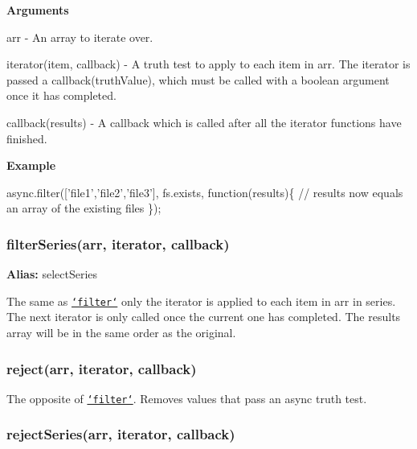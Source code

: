 {\bfseries Arguments}


\begin{DoxyItemize}
\item {\ttfamily arr} -\/ An array to iterate over.
\item {\ttfamily iterator(item, callback)} -\/ A truth test to apply to each item in {\ttfamily arr}. The {\ttfamily iterator} is passed a {\ttfamily callback(truth\+Value)}, which must be called with a boolean argument once it has completed.
\item {\ttfamily callback(results)} -\/ A callback which is called after all the {\ttfamily iterator} functions have finished.
\end{DoxyItemize}

{\bfseries Example}


\begin{DoxyCode}
async.filter([\textcolor{stringliteral}{'file1'},\textcolor{stringliteral}{'file2'},\textcolor{stringliteral}{'file3'}], fs.exists, \textcolor{keyword}{function}(results)\{
    \textcolor{comment}{// results now equals an array of the existing files}
\});
\end{DoxyCode}
 



\label{_selectSeries}%
 \label{_filterSeries}%
 \subsubsection*{filter\+Series(arr, iterator, callback)}

{\bfseries Alias\+:} {\ttfamily select\+Series}

The same as \href{#filter}{\tt `filter`} only the {\ttfamily iterator} is applied to each item in {\ttfamily arr} in series. The next {\ttfamily iterator} is only called once the current one has completed. The results array will be in the same order as the original. 



\label{_reject}%
 \subsubsection*{reject(arr, iterator, callback)}

The opposite of \href{#filter}{\tt `filter`}. Removes values that pass an {\ttfamily async} truth test. 



\label{_rejectSeries}%
 \subsubsection*{reject\+Series(arr, iterator, callback)}

